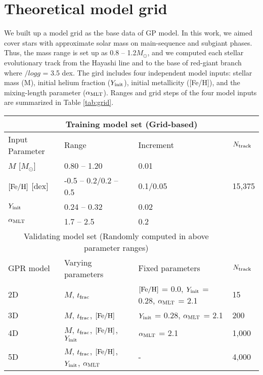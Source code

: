 \section{Theoretical  model grid}\label{sec:grid}

We built up a model grid as the base data of GP model. In this work, we aimed cover stars with approximate solar mass on main-sequence and subgiant phases. Thus, the mass range is set up as 0.8 -- 1.2$M_{\odot}$, and we computed each stellar evolutionary track from the Hayashi line and to the base of red-giant branch where $/log g$ = 3.5 dex. The gird includes four independent model inputs: stellar mass (M), initial helium fraction ($Y_{\rm init}$), initial metallicity ([Fe/H]), and the mixing-length parameter ($\alpha_{\rm MLT}$).  Ranges and grid steps of the four model inputs are summarized in Table \ref{tab:grid}.

\begin{table*}
	\centering
	\caption{Stellar model computations for training and validating sets.}
	\label{tab:grid}
	\begin{tabular}{llll} %
		\hline
		\multicolumn{4}{c}{Training model set (Grid-based)}\\
		\hline
		Input Parameter & Range & Increment & $N_{\rm track}$\\
        \hline
	$M$ [$M_{\odot}$]  & 0.80 -- 1.20 &  0.01&\\
        $\rm{[Fe/H]}$ [dex] & -0.5 -- 0.2/0.2 -- 0.5 & 0.1/0.05 & 15,375\\
        	$Y_{\rm init}$ & 0.24 -- 0.32 & 0.02&\\
        $\alpha_{\rm{MLT}}$  & 1.7 -- 2.5&  0.2&\\
        \hline
        \multicolumn{3}{c}{Validating model set (Randomly computed in above parameter ranges)}\\
	\hline
	GPR model & Varying parameters & Fixed parameters& $N_{\rm track}$\\
	\hline
	2D& $M$, $t_{\rm frac}$ & $\rm{[Fe/H]}$ = 0.0,  $Y_{\rm init}$ = 0.28, $\alpha_{\rm{MLT}}$  = 2.1&15\\
	3D& $M$, $t_{\rm frac}$, $\rm{[Fe/H]}$ &$Y_{\rm init}$ = 0.28, $\alpha_{\rm{MLT}}$  = 2.1&200\\
	4D& $M$, $t_{\rm frac}$, $\rm{[Fe/H]}$, $Y_{\rm init}$ & $\alpha_{\rm{MLT}}$  = 2.1&1,000\\
	5D& $M$, $t_{\rm frac}$, $\rm{[Fe/H]}$, $Y_{\rm init}$, $\alpha_{\rm{MLT}}$ & - &4,000\\
        \hline

	\end{tabular}
\end{table*}

